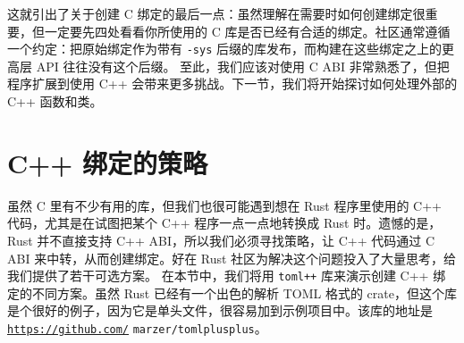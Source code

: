 \label{idx:idx_9bd5fe86}
\label{idx:idx_873f082d}
这就引出了关于创建 C 绑定的最后一点：虽然理解在需要时如何创建绑定很重要，但一定要先四处看看你所使用的 C 库是否已经有合适的绑定。社区通常遵循一个约定：把原始绑定作为带有 \texttt{-sys} 后缀的库发布，而构建在这些绑定之上的更高层 API 往往没有这个后缀。
至此，我们应该对使用 C ABI 非常熟悉了，但把程序扩展到使用 C++ 会带来更多挑战。下一节，我们将开始探讨如何处理外部的 C++ 函数和类。
\section{C++ 绑定的策略}
\label{idx:idx_2f5b8057}
虽然 C 里有不少有用的库，但我们也很可能遇到想在 Rust 程序里使用的 C++ 代码，尤其是在试图把某个 C++ 程序一点一点地转换成 Rust 时。遗憾的是，Rust 并不直接支持 C++ ABI，所以我们必须寻找策略，让 C++ 代码通过 C ABI 来中转，从而创建绑定。好在 Rust 社区为解决这个问题投入了大量思考，给我们提供了若干可选方案。
在本节中，我们将用 \texttt{toml++} 库来演示创建 C++ 绑定的不同方案。虽然 Rust 已经有一个出色的解析 TOML 格式的 crate，但这个库是个很好的例子，因为它是单头文件，很容易加到示例项目中。该库的地址是 \href{https://github.com/}{\texttt{https:/\allowbreak{}/\allowbreak{}github.\allowbreak{}com/\allowbreak{}}}
\texttt{marzer/\allowbreak{}tomlplusplus}。
